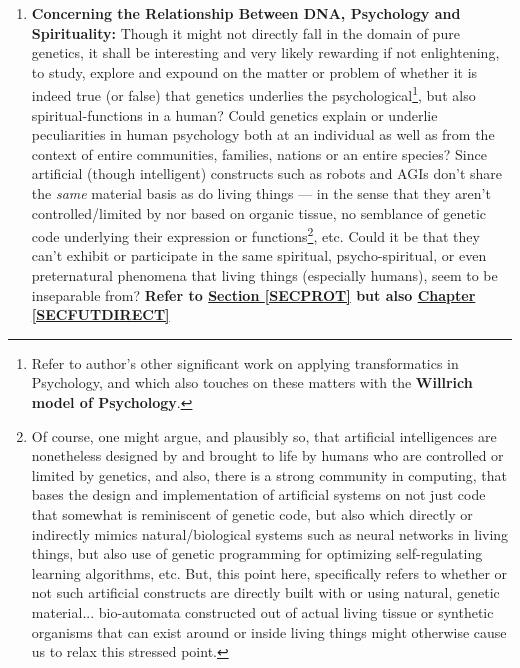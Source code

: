 \documentclass[a4paper, 18pt]{book} %
\begin{document}
\begin{enumerate}
\item \textbf{Concerning the Relationship Between DNA, Psychology and Spirituality:} Though it might not directly fall in the domain of pure genetics, it shall be interesting and very likely rewarding if not enlightening, to study, explore and expound on the matter or problem of whether it is indeed true (or false) that genetics underlies the psychological\footnote{Refer to author's other significant work on applying transformatics in Psychology\cite{Lutalo2025transpsy}, and which also touches on these matters with the \textbf{Willrich model of Psychology}.}, but also spiritual-functions in a human? Could genetics explain or underlie peculiarities in human psychology both at an individual as well as from the context of entire communities, families, nations or an entire species? Since artificial (though intelligent) constructs such as robots and AGIs don't share the \textit{same} material basis as do living things --- in the sense that they aren't controlled/limited by nor based on organic tissue, no semblance of genetic code underlying their expression or functions\footnote{Of course, one might argue, and plausibly so, that artificial intelligences are nonetheless designed by and brought to life by humans who are controlled or limited by genetics, and also, there is a strong community in computing, that bases the design and implementation of artificial systems on not just code that somewhat is reminiscent of genetic code, but also which directly or indirectly mimics natural/biological systems such as neural networks in living things, but also use of genetic programming for optimizing self-regulating learning algorithms, etc. But, this point here, specifically refers to whether or not such artificial constructs are directly built with or using natural, genetic material... bio-automata constructed out of actual living tissue or synthetic organisms that can exist around or inside living things might otherwise cause us to relax this stressed point.}, etc. Could it be that they can't exhibit or participate in the same spiritual, psycho-spiritual, or even preternatural phenomena that living things (especially humans), seem to be inseparable from?  \textbf{Refer to \textbf{\hyperref[SECPROT]{Section \ref{SECPROT}}} but also \textbf{\hyperref[SECFUTDIRECT]{Chapter \ref{SECFUTDIRECT}}}} 


\end{enumerate}
\end{document}

